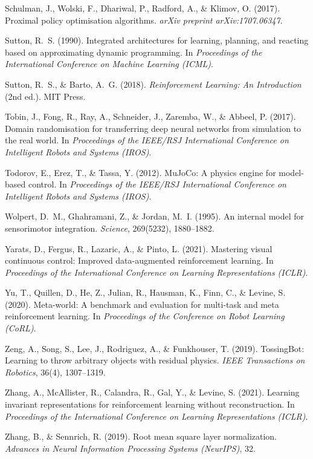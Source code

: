 \documentclass[12pt,a4paper,oneside]{report}
\begin{document}
Schulman, J., Wolski, F., Dhariwal, P., Radford, A., \& Klimov, O. (2017). Proximal policy optimisation algorithms. \emph{arXiv preprint arXiv:1707.06347}.

Sutton, R.~S. (1990). Integrated architectures for learning, planning, and reacting based on approximating dynamic programming. In \emph{Proceedings of the International Conference on Machine Learning (ICML)}.

Sutton, R.~S., \& Barto, A.~G. (2018). \emph{Reinforcement Learning: An Introduction} (2nd ed.). MIT Press.

Tobin, J., Fong, R., Ray, A., Schneider, J., Zaremba, W., \& Abbeel, P. (2017). Domain randomisation for transferring deep neural networks from simulation to the real world. In \emph{Proceedings of the IEEE/RSJ International Conference on Intelligent Robots and Systems (IROS)}.

Todorov, E., Erez, T., \& Tassa, Y. (2012). MuJoCo: A physics engine for model-based control. In \emph{Proceedings of the IEEE/RSJ International Conference on Intelligent Robots and Systems (IROS)}.

Wolpert, D.~M., Ghahramani, Z., \& Jordan, M.~I. (1995). An internal model for sensorimotor integration. \emph{Science}, 269(5232), 1880--1882.

Yarats, D., Fergus, R., Lazaric, A., \& Pinto, L. (2021). Mastering visual continuous control: Improved data-augmented reinforcement learning. In \emph{Proceedings of the International Conference on Learning Representations (ICLR)}.

Yu, T., Quillen, D., He, Z., Julian, R., Hausman, K., Finn, C., \& Levine, S. (2020). Meta-world: A benchmark and evaluation for multi-task and meta reinforcement learning. In \emph{Proceedings of the Conference on Robot Learning (CoRL)}.

Zeng, A., Song, S., Lee, J., Rodriguez, A., \& Funkhouser, T. (2019). TossingBot: Learning to throw arbitrary objects with residual physics. \emph{IEEE Transactions on Robotics}, 36(4), 1307--1319.

Zhang, A., McAllister, R., Calandra, R., Gal, Y., \& Levine, S. (2021). Learning invariant representations for reinforcement learning without reconstruction. In \emph{Proceedings of the International Conference on Learning Representations (ICLR)}.

Zhang, B., \& Sennrich, R. (2019). Root mean square layer normalization. \emph{Advances in Neural Information Processing Systems (NeurIPS)}, 32.
\end{document}

